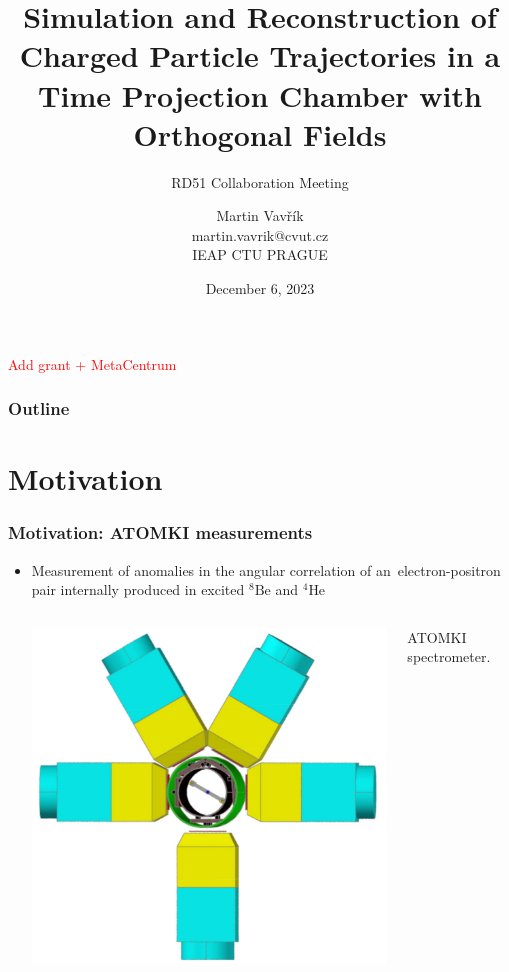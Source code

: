 \documentclass{beamer}
\title[OFTPC track simulation \& reconstruction]{Simulation and Reconstruction of Charged Particle Trajectories in a Time Projection Chamber with Orthogonal Fields}
\subtitle{RD51 Collaboration Meeting}
\author[M.~Vavřík]{\foreignlanguage{czech}{Martin Vavřík}\vspace{0.5cm}\\martin.vavrik@cvut.cz\\IEAP CTU PRAGUE\\}
\date{December 6, 2023}
\begin{document}
	
	\begin{frame}
		\titlepage
		\textcolor{red}{Add grant + MetaCentrum}
	\end{frame}
	
	\begin{frame}
		\frametitle{Outline}
		\tableofcontents
	\end{frame}
	
	\section{Motivation}
	\begin{frame}
		\frametitle{Motivation: ATOMKI measurements}
		\begin{itemize}
			\item Measurement of anomalies in the angular correlation of an~electron-positron pair internally produced in excited $ {}^8\text{Be} $ and $ {}^4\text{He} $\newline
			\begin{columns}
				\column{0.33 \textwidth}
					\centering
					\begin{minipage}[t][4cm]{\textwidth}
						\centering
						\includegraphics[width=\textwidth]{../images/atomki_detector.png}
					\end{minipage}
					\small{ATOMKI spectrometer.~\cite{atomki_det}}\\ \vspace{0.1cm}

\end{columns}
\end{itemize}
\end{frame}
\end{document}
